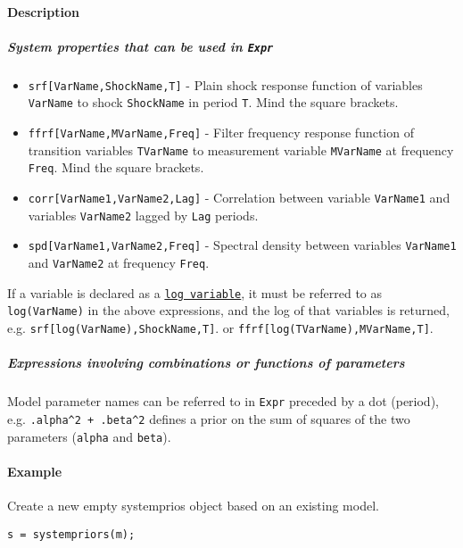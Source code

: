 \paragraph{Description}

\subparagraph{System properties that can be used in
\texttt{Expr}}

\begin{itemize}
\item
  \texttt{srf{[}VarName,ShockName,T{]}} - Plain shock response function
  of variables \texttt{VarName} to shock \texttt{ShockName} in period
  \texttt{T}. Mind the square brackets.
\item
  \texttt{ffrf{[}VarName,MVarName,Freq{]}} - Filter frequency response
  function of transition variables \texttt{TVarName} to measurement
  variable \texttt{MVarName} at frequency \texttt{Freq}. Mind the square
  brackets.
\item
  \texttt{corr{[}VarName1,VarName2,Lag{]}} - Correlation between
  variable \texttt{VarName1} and variables \texttt{VarName2} lagged by
  \texttt{Lag} periods.
\item
  \texttt{spd{[}VarName1,VarName2,Freq{]}} - Spectral density between
  variables \texttt{VarName1} and \texttt{VarName2} at frequency
  \texttt{Freq}.
\end{itemize}

If a variable is declared as a
\href{modellang/logvariables}{\texttt{log variable}}, it must be
referred to as \texttt{log(VarName)} in the above expressions, and the
log of that variables is returned, e.g.
\texttt{srf{[}log(VarName),ShockName,T{]}}. or
\texttt{ffrf{[}log(TVarName),MVarName,T{]}}.

\subparagraph{Expressions involving combinations or functions of
parameters}

Model parameter names can be referred to in \texttt{Expr} preceded by a
dot (period), e.g. \texttt{.alpha\^{}2 + .beta\^{}2} defines a prior on
the sum of squares of the two parameters (\texttt{alpha} and
\texttt{beta}).

\paragraph{Example}

Create a new empty systemprios object based on an existing model.

\begin{verbatim}
s = systempriors(m);
\end{verbatim}


